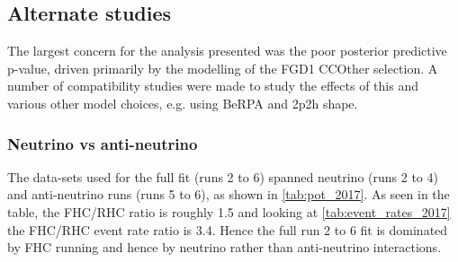 


\subsection{Alternate studies}
\label{sec:data_alt_studies}
The largest concern for the analysis presented was the poor posterior predictive p-value, driven primarily by the modelling of the FGD1 CCOther selection. A number of compatibility studies were made to study the effects of this and various other model choices, e.g. using BeRPA and 2p2h shape.

\subsubsection{Neutrino vs anti-neutrino}
The data-sets used for the full fit (runs 2 to 6) spanned neutrino (runs 2 to 4) and anti-neutrino runs (runs 5 to 6), as shown in  \autoref{tab:pot_2017}. As seen in the table, the FHC/RHC ratio is roughly 1.5 and looking at \autoref{tab:event_rates_2017} the FHC/RHC event rate ratio is 3.4. Hence the full run 2 to 6 fit is dominated by FHC running and hence by neutrino rather than anti-neutrino interactions.

